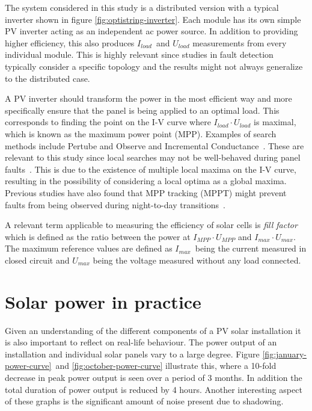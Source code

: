 
The system considered in this study is a distributed version with a typical inverter shown in figure \ref{fig:optistring-inverter}.
Each module has its own simple PV inverter acting as an independent ac power source.
In addition to providing higher efficiency, this also produces $I_{load}$ and $U_{load}$ measurements from every individual module.
This is highly relevant since studies in fault detection typically consider a specific topology and the results might not always generalize to the distributed case.

A PV inverter should transform the power in the most efficient way and more specifically ensure that the panel is being applied to an optimal load.
This corresponds to finding the point on the I-V curve where $I_{load} \cdot U_{load}$ is maximal, which is known as the maximum power point (MPP).
Examples of search methods include Pertube and Observe and Incremental Conductance~\cite{Roman2006}.
These are relevant to this study since local searches may not be well-behaved during panel faults~\cite{Roman2006}.
This is due to the existence of multiple local maxima on the I-V curve, resulting in the possibility of considering a local optima as a global maxima.
Previous studies have also found that MPP tracking (MPPT) might prevent faults from being observed during night-to-day transitions~\cite{Zhao2010night}.

A relevant term applicable to measuring the efficiency of solar cells is \emph{fill factor} which is defined as the ratio between the power at $I_{MPP} \cdot U_{MPP}$ and $I_{max} \cdot U_{max}$.
The maximum reference values are defined as $I_{max}$ being the current measured in closed circuit and $U_{max}$ being the voltage measured without any load connected.


\section{Solar power in practice}
Given an understanding of the different components of a PV solar installation it is also important to reflect on real-life behaviour.
The power output of an installation and individual solar panels vary to a large degree.
Figure \ref{fig:january-power-curve} and \ref{fig:october-power-curve} illustrate this, where a 10-fold decrease in peak power output is seen over a period of 3 months.
In addition the total duration of power output is reduced by 4 hours.
Another interesting aspect of these graphs is the significant amount of noise present due to shadowing.

